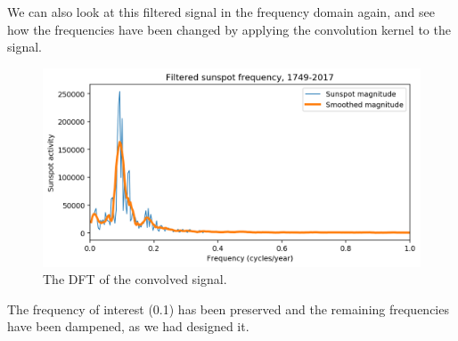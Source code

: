 \documentclass[a4paper, openany]{memoir}
\begin{document}
\noindent We can also look at this filtered signal in the frequency domain again, and see how the frequencies have been changed by applying the convolution kernel to the signal.
\begin{figure}[H]
    \centering
    \includegraphics[scale=0.6]{src/6.31 sunspots convolved frequency.png}
    \caption{The DFT of the convolved signal.}
\end{figure}
\noindent The frequency of interest (0.1) has been preserved and the remaining frequencies have been dampened, as we had designed it.
\end{document}
